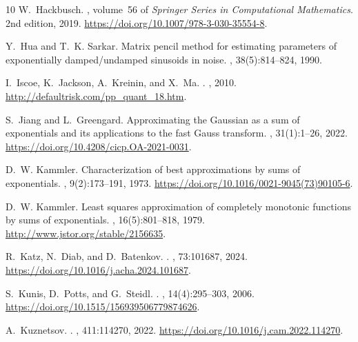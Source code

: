 \documentclass[12pt]{article}
\begin{document}
\begin{thebibliography}{10}
W.~Hackbusch.
, volume~56 of {\em
  Springer Series in Computational Mathematics}.
\newblock 2nd edition, 2019.
\newblock \url{https://doi.org/10.1007/978-3-030-35554-8}.

Y.~Hua and T.~K. Sarkar.
\newblock Matrix pencil method for estimating parameters of exponentially
  damped/undamped sinusoids in noise.
,
  38(5):814--824, 1990.

I.~Iscoe, K.~Jackson, A.~Kreinin, and X.~Ma.
.
, 2010.
\newblock \url{http://defaultrisk.com/pp_quant_18.htm}.

S.~Jiang and L.~Greengard.
\newblock Approximating the {G}aussian as a sum of exponentials and its
  applications to the fast {G}auss transform.
, 31(1):1--26, 2022.
\newblock \url{https://doi.org/10.4208/cicp.OA-2021-0031}.

D.~W. Kammler.
\newblock Characterization of best approximations by sums of exponentials.
, 9(2):173--191, 1973.
\newblock \url{https://doi.org/10.1016/0021-9045(73)90105-6}.

D.~W. Kammler.
\newblock Least squares approximation of completely monotonic functions by sums
  of exponentials.
, 16(5):801--818, 1979.
\newblock \url{http://www.jstor.org/stable/2156635}.

R.~Katz, N.~Diab, and D.~Batenkov.
.
, 73:101687, 2024.
\newblock \url{https://doi.org/10.1016/j.acha.2024.101687}.

S.~Kunis, D.~Potts, and G.~Steidl.
.
, 14(4):295--303, 2006.
\newblock \url{https://doi.org/10.1515/156939506779874626}.

A.~Kuznetsov.
.
, 411:114270,
  2022.
\newblock \url{https://doi.org/10.1016/j.cam.2022.114270}.


\end{thebibliography}
\end{document}
